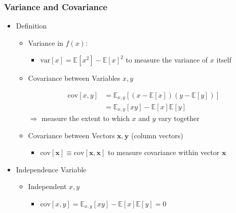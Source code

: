 \subsubsection{Variance and Covariance}
\begin{itemize}
\item Definition
	\begin{itemize}
	\item Variance in $f(x)$:
		\begin{itemize}
		\Item \begin{align*} \text{var}[f] &= \mathbb{E} \left[ \left(f(x) - \mathbb{E}[f(x)] \right)^2 \right] \\ &= \mathbb{E}[f(x)^2] - \mathbb{E}[f(x)]^2 \end{align*}
		$\Rightarrow$ measure the variability in $f(x)$ around its mean
		\item $\text{var}[x]=\mathbb{E}[x^2]-\mathbb{E}[x]^2$ to measure the variance of $x$ itself
		\end{itemize}
	\item Covariance between Variables $x,y$
		\begin{itemize}
		\Item \begin{align*} \text{cov}[x,y] &= \mathbb{E}_{x,y}[(x-\mathbb{E}[x])(y-\mathbb{E}[y])] \\ &= \mathbb{E}_{x,y}[xy] - \mathbb{E}[x]\mathbb{E}[y] \end{align*}
		$\Rightarrow$ measure the extent to which $x$ and $y$ vary together
		\end{itemize}
	\item Covariance between Vectors $\mathbf x, \mathbf y$ (column vectors)
		\begin{itemize}
		\Item \begin{align*} \text{cov}[\mathbf x, \mathbf y] &= \mathbb{E}_{\mathbf x,\mathbf y}[(\mathbf x - \mathbb{E}[\mathbf x]) \cdot (\mathbf y^T -\mathbb{E}[\mathbf y^T])] \\ &= \mathbb{E}_{\mathbf x,\mathbf y}[\mathbf{xy}^T] - \mathbb{E}[\mathbf x]\mathbb E[\mathbf y^T] \end{align*}
		$\Rightarrow$ a covariance matrix for pairwise covariance between components of $\mathbf x,\mathbf y$
		\item $\text{cov}[\mathbf x] \equiv \text{cov}[\mathbf x, \mathbf x]$ to measure covariance within vector $\mathbf x$
		\end{itemize}
	\end{itemize}
\item Independence Variable
	\begin{itemize}
	\item Independent $x,y$
		\begin{itemize}
		\item $\text{cov}[x,y] = \mathbb E_{x,y}[xy] -\mathbb{E}[x]\mathbb{E}[y] = 0$
		\end{itemize}
	\end{itemize}
\end{itemize}

